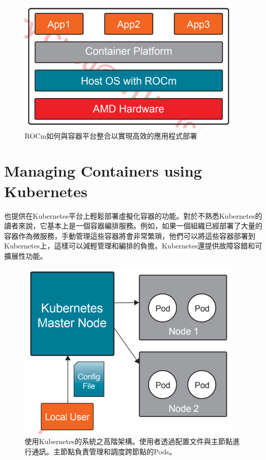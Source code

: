 \begin{figure}[h]
    \centering
    \includegraphics[width=0.75\linewidth]{FileAusiliari//Screenshots/Figure12-1.png}
    \caption{ROCm如何與容器平台整合以實現高效的應用程式部署}
    \label{fig:12-1}
\end{figure}

\section{Managing  Containers using Kubernetes}

 也提供在Kubernetes平台上輕鬆部署虛擬化容器的功能。對於不熟悉Kubernetes的讀者來說，它基本上是一個容器編排服務。例如，如果一個組織已經部署了大量的容器作為微服務，手動管理這些容器將會非常繁瑣，他們可以將這些容器部署到Kubernetes上，這樣可以減輕管理和編排的負擔。Kubernetes還提供故障容錯和可擴展性功能。

\begin{figure}[h]
    \centering
    \includegraphics[width=0.75\linewidth]{FileAusiliari//Screenshots/Figure12-2.png}
    \caption{使用Kubernetes的系統之高階架構。使用者透過配置文件與主節點進行通訊。主節點負責管理和調度跨節點的Pods。}
    \label{fig:12-2}
\end{figure}

